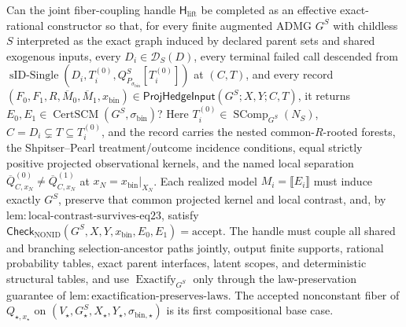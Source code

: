 Can the joint fiber-coupling handle \(\mathsf H_{\mathrm{lift}}\) be completed as an effective exact-rational constructor so that, for every finite augmented ADMG \(G^S\) with childless \(S\) interpreted as the exact graph induced by declared parent sets and shared exogenous inputs, every \(D_i\in\mathcal D_S(D)\), every terminal failed call descended from \(\operatorname{sID\text{-}Single}(D_i,T_i^{(0)},Q_{P_{\sigma_{\mathrm{bin}}}}^S[T_i^{(0)}])\) at \((C,T)\), and every record \((F_0,F_1,R,\overline M_0,\overline M_1,x_{\mathrm{bin}})\in\mathsf{ProjHedgeInput}(G^S;X,Y;C,T)\), it returns \(E_0,E_1\in\operatorname{CertSCM}(G^S,\sigma_{\mathrm{bin}})\)? Here \(T_i^{(0)}\in\operatorname{SComp}_{G^S}(N_S)\), \(C=D_i\subsetneq T\subseteq T_i^{(0)}\), and the record carries the nested common-\(R\)-rooted forests, the Shpitser--Pearl treatment/outcome incidence conditions, equal strictly positive projected observational kernels, and the named local separation \(\overline Q^{(0)}_{C,x_N}\ne\overline Q^{(1)}_{C,x_N}\) at \(x_N=x_{\mathrm{bin}}|_{X_N}\). Each realized model \(M_i=\llbracket E_i\rrbracket\) must induce exactly \(G^S\), preserve that common projected kernel and local contrast, and, by \(\mathrm{lem:local\text{-}contrast\text{-}survives\text{-}eq23}\), satisfy \(\mathsf{Check}_{\mathrm{NONID}}(G^S,X,Y,x_{\mathrm{bin}},E_0,E_1)=\mathrm{accept}\). The handle must couple all shared and branching selection-ancestor paths jointly, output finite supports, rational probability tables, exact parent interfaces, latent scopes, and deterministic structural tables, and use \(\operatorname{Exactify}_{G^S}\) only through the law-preservation guarantee of \(\mathrm{lem:exactification\text{-}preserves\text{-}laws}\). The accepted nonconstant fiber of \(Q_{\star,x_\star}\) on \((V_\star,G_\star^S,X_\star,Y_\star,\sigma_{\mathrm{bin},\star})\) is its first compositional base case.